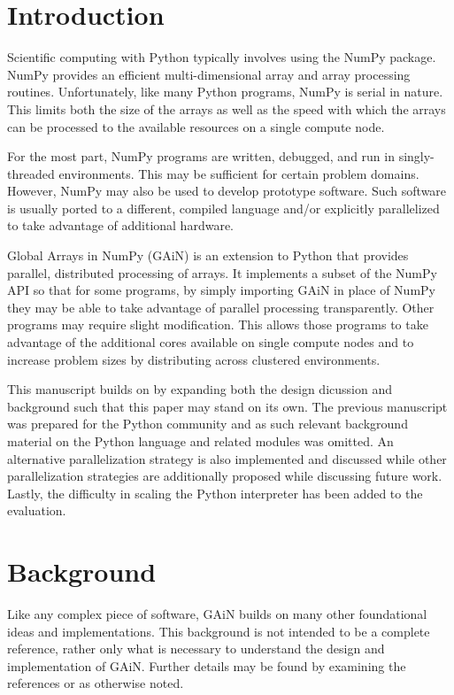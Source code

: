 \documentclass{sigplanconf}
\begin{document}
\section{Introduction}

Scientific computing with Python typically involves using the NumPy package.
NumPy provides an efficient multi-dimensional array and array processing
routines. Unfortunately, like many Python programs, NumPy is serial in nature.
This limits both the size of the arrays as well as the speed with which the
arrays can be processed to the available resources on a single compute node.

For the most part, NumPy programs are written, debugged, and run in
singly-threaded environments. This may be sufficient for certain problem
domains. However, NumPy may also be used to develop prototype software. Such
software is usually ported to a different, compiled language and/or explicitly
parallelized to take advantage of additional hardware.

Global Arrays in NumPy (GAiN) is an extension to Python that provides
parallel, distributed processing of arrays. It implements a subset of the
NumPy API so that for some programs, by simply importing GAiN in place of
NumPy they may be able to take advantage of parallel processing transparently.
Other programs may require slight modification. This allows those programs to
take advantage of the additional cores available on single compute nodes and
to increase problem sizes by distributing across clustered environments.

This manuscript builds on \cite{Dai11} by expanding both the design dicussion
and background such that this paper may stand on its own. The previous
manuscript was prepared for the Python community and as such relevant
background material on the Python language and related modules was omitted. An
alternative parallelization strategy is also implemented and discussed while
other parallelization strategies are additionally proposed while discussing
future work. Lastly, the difficulty in scaling the Python interpreter has been
added to the evaluation.

\section{Background}

Like any complex piece of software, GAiN builds on many other foundational
ideas and implementations. This background is not intended to be a complete
reference, rather only what is necessary to understand the design and
implementation of GAiN. Further details may be found by examining the
references or as otherwise noted.
\end{document}
